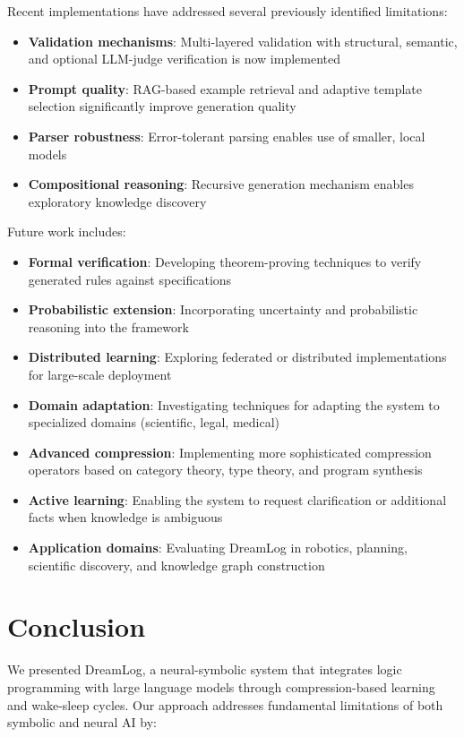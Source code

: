 \documentclass[10pt,conference]{IEEEtran}
\begin{document}
Recent implementations have addressed several previously identified limitations:
\begin{itemize}
\item \textbf{Validation mechanisms}: Multi-layered validation with structural, semantic, and optional LLM-judge verification is now implemented
\item \textbf{Prompt quality}: RAG-based example retrieval and adaptive template selection significantly improve generation quality
\item \textbf{Parser robustness}: Error-tolerant parsing enables use of smaller, local models
\item \textbf{Compositional reasoning}: Recursive generation mechanism enables exploratory knowledge discovery
\end{itemize}

Future work includes:
\begin{itemize}
\item \textbf{Formal verification}: Developing theorem-proving techniques to verify generated rules against specifications
\item \textbf{Probabilistic extension}: Incorporating uncertainty and probabilistic reasoning into the framework
\item \textbf{Distributed learning}: Exploring federated or distributed implementations for large-scale deployment
\item \textbf{Domain adaptation}: Investigating techniques for adapting the system to specialized domains (scientific, legal, medical)
\item \textbf{Advanced compression}: Implementing more sophisticated compression operators based on category theory, type theory, and program synthesis
\item \textbf{Active learning}: Enabling the system to request clarification or additional facts when knowledge is ambiguous
\item \textbf{Application domains}: Evaluating DreamLog in robotics, planning, scientific discovery, and knowledge graph construction
\end{itemize}

\section{Conclusion}

We presented DreamLog, a neural-symbolic system that integrates logic programming with large language models through compression-based learning and wake-sleep cycles. Our approach addresses fundamental limitations of both symbolic and neural AI by:
\end{document}
